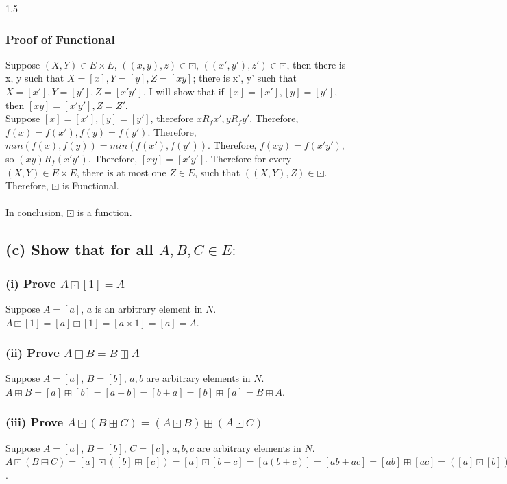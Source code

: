 \documentclass[]{article}
\begin{document}
\begin{spacing}{1.5}
		\subsubsection*{Proof of Functional}
		Suppose $ (X,Y) \in E \times E$, $ ((x,y),z) \in \boxdot $, $ ((x',y'),z') \in \boxdot $, then there is x, y such that  $ X=[x], Y=[y], Z = [xy]$; there is x', y' such that  $ X=[x'], Y=[y'], Z = [x'y']$. I will show that  if $ [x]=[x'], [y]=[y'] $, then $ [xy]=[x'y'], Z=Z' $.\\
		Suppose $ [x]=[x'], [y]=[y'] $, therefore $ x R_f x', y R_f y' $. Therefore, $ f(x)=f(x'), f(y)=f(y') $. Therefore, $ min(f(x),f(y)) = min(f(x'),f(y')) $. Therefore, $ f(xy) = f(x'y') $, so $ (xy) R_f (x'y') $. Therefore, $ [xy] = [x'y'].$ Therefore for every $ (X,Y) \in E \times E$, there is at most one $ Z \in E $, such that $ ((X,Y),Z) \in \boxdot $. Therefore, $ \boxdot $ is Functional.\\
		~\\
		In conclusion, $ \boxdot $ is a function.
		\subsection*{(c) Show that for all $ A,B,C \in E: $}
		\subsubsection*{(i) Prove $ A \boxdot [1] = A$}
		Suppose $ A = [a] $, $ a $ is an arbitrary element in $ N $.\\
		$ A \boxdot [1] = [a] \boxdot [1] = [a \times 1] = [a] = A$.
		\subsubsection*{(ii) Prove $ A \boxplus B = B \boxplus A$}
		Suppose $ A = [a] $, $ B = [b] $, $ a, b $ are arbitrary elements in $ N $.\\
		$ A \boxplus B =  [a] \boxplus [b] = [a+b] = [b+a] = [b] \boxplus [a] = B \boxplus A$.
		\subsubsection*{(iii) Prove $ A \boxdot (B \boxplus C) = (A \boxdot B) \boxplus (A \boxdot C)$}
		Suppose $ A = [a] $, $ B = [b] $, $ C = [c] $, $ a, b, c $ are arbitrary elements in $ N $.\\
		$ A \boxdot (B \boxplus C) = [a] \boxdot ([b] \boxplus [c])  = [a] \boxdot [b+c] = [a(b+c)] = [ab+ac] = [ab]  \boxplus [ac] = ([a] \boxdot [b]) \boxplus ([a] \boxdot [c]) = (A \boxdot B) \boxplus (A \boxdot C)$.
		

\end{spacing}
\end{document}
